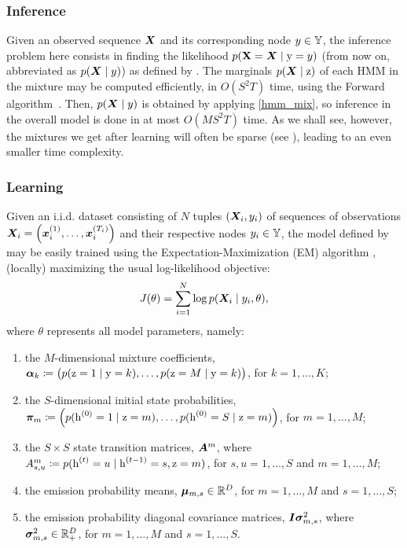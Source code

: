 \subsubsection{Inference}
\label{sec:inference}
Given an observed sequence ${\bm{X}}$ and its corresponding node $y \in {\mathbb{Y}}$, the inference problem here consists in finding the likelihood $p({\mathbf{X}}={\bm{X}} \mid {\textnormal{y}}=y)$ (from now on, abbreviated as $p({\bm{X}} \mid y)$) as defined by  . The marginals $p({\bm{X}}\mid{\textnormal{z}})$ of each HMM in the mixture may be computed efficiently, in $O(S^2T)$ time, using the Forward algorithm~\citet{Rabiner1986}. Then, $p({\bm{X}} \mid y)$ is obtained by applying \eqref{hmm_mix}, so inference in the overall model is done in at most $O(MS^2T)$ time. As we shall see, however, the mixtures we get after learning will often be sparse (see ), leading to an even smaller time complexity.

\subsubsection{Learning}
\label{sec:learning}
Given an i.i.d. dataset consisting of $N$ tuples $({\bm{X}}_i, y_i)$ of sequences of observations ${\bm{X}}_i = \left({\bm{x}}_i^{(1)}, \dots,{\bm{x}}_i^{(T_i)} \right)$ and their respective nodes $y_i \in {\mathbb{Y}}$, the model defined by  may be easily trained using the Expectation-Maximization (EM) algorithm \citet{Dempster1977}, (locally) maximizing the usual log-likelihood objective:
\begin{equation}
\label{log_likelihood}
J(\theta) = \sum_{i=1}^N \log p({\bm{X}}_i \mid y_i, \theta),
\end{equation}
where $\theta$ represents all model parameters, namely:
\begin{enumerate}
	\item the $M$-dimensional mixture coefficients, ${\bm{\alpha}}_k \coloneqq \left(p({\textnormal{z}}=1\mid{\textnormal{y}}=k), \dots, p({\textnormal{z}}=M\mid{\textnormal{y}}=k)\right)$, for $k = 1,\dots,K$;
	\item the $S$-dimensional initial state probabilities, ${\bm{\pi}}_m \coloneqq \left(p({\textnormal{h}}^{(0)}=1 \mid {\textnormal{z}}=m),\dots,p({\textnormal{h}}^{(0)}=S \mid {\textnormal{z}}=m)\right)$, for $m = 1,\dots,M$;
	\item the $S \times S$ state transition matrices, ${\bm{A}}^m$, where ${A}^m_{s,u} \coloneqq p({\textnormal{h}}^{(t)}=u \mid {\textnormal{h}}^{(t-1)}=s, {\textnormal{z}}=m)$, for $s,u = 1,\dots,S$ and $m = 1,\dots,M$;
	\item the emission probability means, ${\bm{\mu}}_{m,s} \in \mathbb{R}^D$, for $m = 1,\dots,M$ and $s = 1,\dots,S$;
	\item the emission probability diagonal covariance matrices, ${\bm{I}} {\bm{\sigma}}^2_{m,s}$, where ${\bm{\sigma}}^2_{m,s} \in \mathbb{R}^{D}_{+}$, for $m = 1,\dots,M$ and $s = 1,\dots,S$.
\end{enumerate}

